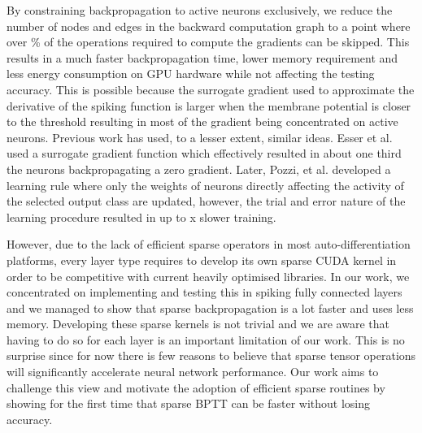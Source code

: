 \documentclass{article}
\begin{document}
By constraining backpropagation to active neurons exclusively, we reduce the number of nodes and edges in the backward computation graph to a point where over \% of the operations required to compute the gradients can be skipped. This results in a much faster backpropagation time, lower memory requirement and less energy consumption on GPU hardware while not affecting the testing accuracy. This is possible because the surrogate gradient used to approximate the derivative of the spiking function is larger when the membrane potential is closer to the threshold resulting in most of the gradient being concentrated on active neurons. Previous work has used, to a lesser extent, similar ideas. Esser et al. \cite{esser2016convolutional} used a surrogate gradient function which effectively resulted in about one third the neurons backpropagating a zero gradient. Later, Pozzi, et al. \cite{pozzi2020attention} developed a learning rule where only the weights of neurons directly affecting the activity of the selected output class are updated, however, the trial and error nature of the learning procedure resulted in up to x slower training. 



However, due to the lack of efficient sparse operators in most auto-differentiation platforms, every layer type requires to develop its own sparse CUDA kernel in order to be competitive with current heavily optimised libraries. In our work, we concentrated on implementing and testing this in spiking fully connected layers and we managed to show that sparse backpropagation is a lot faster and uses less memory. Developing these sparse kernels is not trivial and we are aware that having to do so for each layer is an important limitation of our work. This is no surprise since for now there is few reasons to believe that sparse tensor operations will significantly accelerate neural network performance. Our work aims to challenge this view and motivate the adoption of efficient sparse routines by showing for the first time that sparse BPTT can be faster without losing accuracy.
\end{document}
